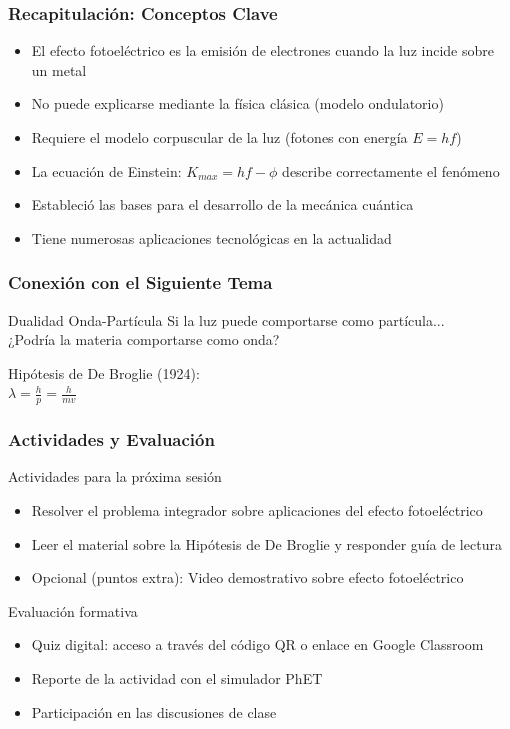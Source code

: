 \documentclass{beamer}
\begin{document}
	\begin{frame}
		\frametitle{Recapitulación: Conceptos Clave}
		\begin{itemize}
			\item El efecto fotoeléctrico es la emisión de electrones cuando la luz incide sobre un metal
			\item No puede explicarse mediante la física clásica (modelo ondulatorio)
			\item Requiere el modelo corpuscular de la luz (fotones con energía $E = hf$)
			\item La ecuación de Einstein: $K_{max} = hf - \phi$ describe correctamente el fenómeno
			\item Estableció las bases para el desarrollo de la mecánica cuántica
			\item Tiene numerosas aplicaciones tecnológicas en la actualidad
		\end{itemize}
	\end{frame}
	
	\begin{frame}
		\frametitle{Conexión con el Siguiente Tema}
		\begin{alertblock}{Dualidad Onda-Partícula}
			\centering
			Si la luz puede comportarse como partícula...\\
			¿Podría la materia comportarse como onda?
		\end{alertblock}
		
		\begin{center}
			\Large
			Hipótesis de De Broglie (1924):\\
			$\lambda = \frac{h}{p} = \frac{h}{mv}$
		\end{center}
	\end{frame}
	
	\begin{frame}
		\frametitle{Actividades y Evaluación}
		\begin{block}{Actividades para la próxima sesión}
			\begin{itemize}
				\item Resolver el problema integrador sobre aplicaciones del efecto fotoeléctrico
				\item Leer el material sobre la Hipótesis de De Broglie y responder guía de lectura
				\item Opcional (puntos extra): Video demostrativo sobre efecto fotoeléctrico
			\end{itemize}
		\end{block}
		
		\begin{alertblock}{Evaluación formativa}
			\begin{itemize}
				\item Quiz digital: acceso a través del código QR o enlace en Google Classroom
				\item Reporte de la actividad con el simulador PhET
				\item Participación en las discusiones de clase
			\end{itemize}
		\end{alertblock}
	\end{frame}
	
\end{document}
